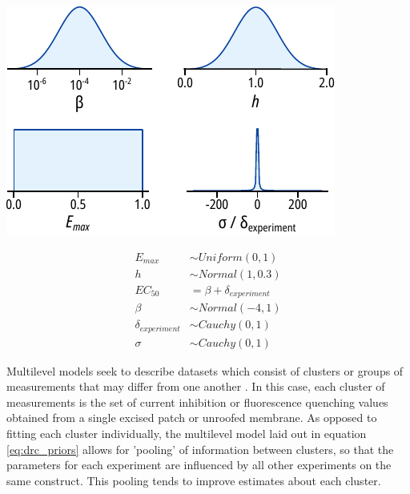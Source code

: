 \begin{minipage}{.5\textwidth}
\centering
\includegraphics[width=\textwidth]{drc_priors.pdf}
\end{minipage}
\begin{minipage}{.5\textwidth}
\centering
\begin{equation} \label{eq:drc_priors}
\begin{split}
E_{max} &\sim Uniform(0, 1) \\
h &\sim Normal(1, 0.3) \\
EC_{50} &= \beta + \delta_{experiment} \\
\beta &\sim Normal(-4, 1) \\
\delta_{experiment} &\sim Cauchy(0, 1) \\
\sigma &\sim Cauchy(0, 1)
\end{split}
\end{equation}
\end{minipage}

Multilevel models seek to describe datasets which consist of clusters or groups of measurements that may differ from one another \cite{andrew_gelman_bayesian_2014, mcelreath_statistical_2020}.
In this case, each cluster of measurements is the set of current inhibition or fluorescence quenching values obtained from a single excised patch or unroofed membrane.
As opposed to fitting each cluster individually, the multilevel model laid out in equation \ref{eq:drc_priors} allows for 'pooling' of information between clusters, so that the parameters for each experiment are influenced by all other experiments on the same construct.
This pooling tends to improve estimates about each cluster.

